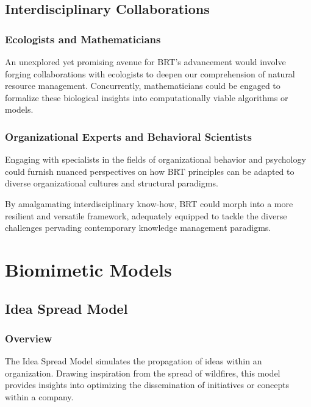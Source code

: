 \documentclass[sn-nature]{sn-jnl}%
\theoremstyle{thmstyleone}%
\theoremstyle{thmstyletwo}%
\theoremstyle{thmstylethree}%
\begin{document}
\subsection{Interdisciplinary Collaborations}

\subsubsection{Ecologists and Mathematicians}
An unexplored yet promising avenue for BRT's advancement would involve forging collaborations with ecologists to deepen our comprehension of natural resource management. Concurrently, mathematicians could be engaged to formalize these biological insights into computationally viable algorithms or models.

\subsubsection{Organizational Experts and Behavioral Scientists}
Engaging with specialists in the fields of organizational behavior and psychology could furnish nuanced perspectives on how BRT principles can be adapted to diverse organizational cultures and structural paradigms.

By amalgamating interdisciplinary know-how, BRT could morph into a more resilient and versatile framework, adequately equipped to tackle the diverse challenges pervading contemporary knowledge management paradigms.






\clearpage


\appendix
\section{Biomimetic Models}

\subsection{Idea Spread Model} \label{A.1}

\subsubsection{Overview}
The Idea Spread Model simulates the propagation of ideas within an organization. Drawing inspiration from the spread of wildfires, this model provides insights into optimizing the dissemination of initiatives or concepts within a company.
\end{document}
